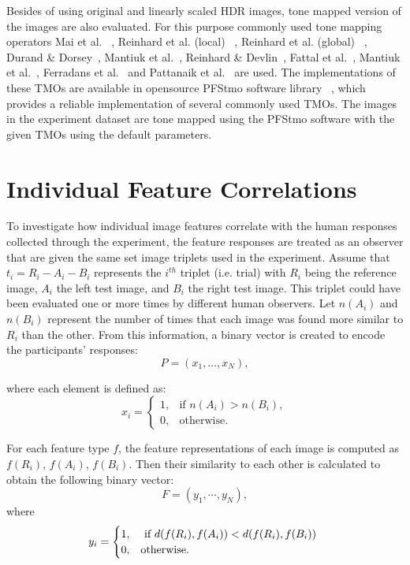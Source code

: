 Besides of using original and linearly scaled HDR images, tone mapped version of the images are also evaluated. For this purpose commonly used tone mapping operators Mai et al. ~\cite{mai2010optimizing}, Reinhard et al. (local) ~\cite{reinhard2002photographic}, Reinhard et al. (global) ~\cite{reinhard2002photographic}, Durand \& Dorsey~\cite{durand2002fast}, Mantiuk et al.~\cite{mantiuk2006perceptual}, Reinhard \& Devlin~\cite{reinhard2005dynamic}, Fattal et al.~\cite{durand2002fast}, Mantiuk et al.~\cite{mantiuk2008display}, Ferradans et al.~\cite{ferradans2011analysis} and Pattanaik et al.~\cite{pattanaik2000time} are used. The implementations of these TMOs are available in opensource PFStmo software library ~\cite{mantiuk2007high}, which provides a reliable implementation of several commonly used TMOs. The images in the experiment dataset are tone mapped using the PFStmo software with the given TMOs using the default parameters.


\section{Individual Feature Correlations}
To investigate how individual image features correlate with the human responses collected through the experiment, the feature responses are treated as an observer that are given the same set image triplets used in the experiment. Assume that $t_i = R_i-A_i-B_i$ represents the $i^{th}$ triplet (i.e. trial) with $R_i$ being the reference image, $A_i$ the left test image, and $B_i$ the right test image. This triplet could have been evaluated one or more times by different human observers. Let $n(A_i)$ and $n(B_i)$ represent the number of times that each image was found more similar to $R_i$ than the other. From this information, a binary vector is created to encode the participants’ responses:
\begin{equation}
\label{eq:p_vector}
P = (x_1, \ldots, x_N),
\end{equation}

where each element is defined as:
\begin{equation}
x_i = \begin{cases}
1, &\text{if $n(A_i) > n(B_i)$}, \\
0, &\text{otherwise}.
\end{cases}
\end{equation}

For each feature type $f$, the feature representations of each image is computed as $f(R_i)$, $f(A_i)$, $f(B_i)$. Then their similarity to each other is calculated to obtain the following binary vector:
\begin{equation}
    F = (y_1,\cdots, y_N ),
\end{equation}
where
\begin{equation}
y_i = \begin{cases}
1, &\text{ if $ d(f(R_i), f(A_i)) < d(f(R_i), f(B_i))$ } \\
0, &\text{otherwise}.
\end{cases}
\end{equation}

